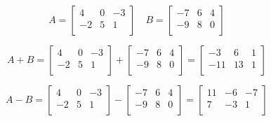 \documentclass[../Matematyka.tex]{subfiles}
\begin{document}
    \begin{displaymath}
        A =
        \begin{bmatrix}
             4 & 0 & -3 \\
            -2 & 5 & 1 \\
        \end{bmatrix}\quad
        B =
        \begin{bmatrix}
            -7 & 6 & 4 \\
            -9 & 8 & 0 \\
        \end{bmatrix}
    \end{displaymath}

    \begin{displaymath}
        A + B =
        \begin{bmatrix}
             4 & 0 & -3 \\
            -2 & 5 & 1 \\
        \end{bmatrix}
        +
        \begin{bmatrix}
            -7 & 6 & 4 \\
            -9 & 8 & 0 \\
        \end{bmatrix}
        =
        \begin{bmatrix}
            -3  & 6  & 1 \\
            -11 & 13 & 1 \\
        \end{bmatrix}
    \end{displaymath}

    \begin{displaymath}
        A - B =
        \begin{bmatrix}
             4 & 0 & -3 \\
            -2 & 5 &  1 \\
        \end{bmatrix}
        -
        \begin{bmatrix}
            -7 & 6 & 4 \\
            -9 & 8 & 0 \\
        \end{bmatrix}
        =
        \begin{bmatrix}
            11 & -6 & -7 \\
            7  & -3 &  1 \\
        \end{bmatrix}
    \end{displaymath}
\end{document}
